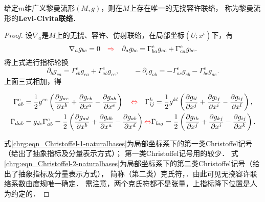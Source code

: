 \begin{theorem}\label{chrg:thm_Levi-Civita-Connetion}
    给定$m$维广义黎曼流形$(M,g)$，则在$M$上存在唯一的无挠容许联络，
    称为黎曼流形的{\bfseries \heiti Levi-Civita联络}．
\end{theorem}
\begin{proof}
    设$\nabla_a$是$M$上的无挠、容许、仿射联络，在局部坐标$(U;x^i)$下，有
    \begin{equation} \label{chrg:eqn_Dg=0}
        \nabla_a g_{bc} =0  {\quad \color{red}\Rightarrow \quad }
        \partial_a g_{bc} = \Gamma_{ba}^e g_{ec} + \Gamma_{ca}^e g_{be} .
    \end{equation}
    将上式进行指标轮换
    \begin{equation*}
        \partial_b g_{ca} = \Gamma_{cb}^e g_{ea} + \Gamma_{ab}^e g_{ce}, \qquad
        -\partial_c g_{ab} = -\Gamma_{ac}^e g_{eb} - \Gamma_{bc}^e g_{ae}  .
    \end{equation*}
    上面三式相加，得
    \begin{small}     \setlength{\mathindent}{0em}
    \begin{subequations}\label{chrg:eqn_Christoffel-naturalbases}
        \begin{align}
            \Gamma_{ab}^c &= \frac{1}{2}g^{ce}\left(
                  \frac{\partial g_{ae}}{\partial x^b}
                + \frac{\partial g_{eb}}{\partial x^a}
                - \frac{\partial g_{ab}}{\partial x^e} \right)
                {\quad \color{red}\Leftrightarrow \quad}
            \Gamma_{ij}^k = \frac{1}{2}{g^{kl}}\left(
                  \frac{\partial g_{il}}{\partial x^j}
                + \frac{\partial g_{lj}}{\partial x^i}
                - \frac{\partial g_{ij}}{\partial x^l} \right),
            \label{chrg:eqn_Christoffel-2-naturalbases} \\
            \Gamma _{dab} &= {g_{dc}}\Gamma _{ab}^c = \frac{1}{2}\left(
                  \frac{\partial g_{ad}}{\partial x^b}
                + \frac{\partial g_{db}}{\partial x^a}
                - \frac{\partial g_{ab}}{\partial x^d} \right)
               {\color{red}\Leftrightarrow}
            \Gamma _{kij} = \frac{1}{2}\left(
                  \frac{\partial g_{ik}}{\partial x^j}
                + \frac{\partial g_{kj}}{\partial x^i}
                - \frac{\partial g_{ij}}{\partial x^k} \right) .
            \label{chrg:eqn_Christoffel-1-naturalbases}
        \end{align}
    \end{subequations}    \setlength{\mathindent}{2em}
    \end{small}
    式\eqref{chrg:eqn_Christoffel-1-naturalbases}为局部坐标系下的第一类Christoffel记号（给出了抽象指标及分量表示方式）；
    第一类Christoffel记号用的较少．
    式\eqref{chrg:eqn_Christoffel-2-naturalbases}为局部坐标系下的第二类Christoffel记号（给出了抽象指标及分量表示方式），
    简称（第二类）克氏符，．由此可见无挠容许联络系数由度规唯一确定．
    需注意，两个克氏符都不是张量，上指标降下位置是人为约定的．


\end{proof}
